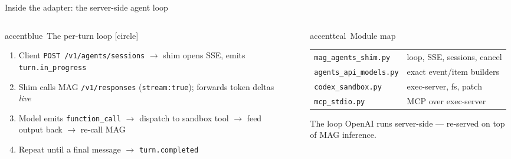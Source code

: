 \begin{frame}{Inside the adapter: the server-side agent loop}
  \begin{columns}[t, totalwidth=\textwidth]
    \begin{column}{0.52\textwidth}
      \begin{featbox}{accentblue}{\ The per-turn loop}
        \small
        [circle]
        \begin{enumerate}
          \item Client \texttt{POST /v1/agents/sessions} $\rightarrow$ shim opens SSE, emits \texttt{turn.in\_progress}
          \item Shim calls MAG \texttt{/v1/responses} (\texttt{stream:true}); forwards token deltas \emph{live}
          \item Model emits \texttt{function\_call} $\rightarrow$ dispatch to sandbox tool $\rightarrow$ feed output back $\rightarrow$ re-call MAG
          \item Repeat until a final message $\rightarrow$ \texttt{turn.completed}
        \end{enumerate}
      \end{featbox}
    \end{column}
    \begin{column}{0.04\textwidth}\end{column}
    \begin{column}{0.44\textwidth}
      \begin{featbox}{accentteal}{\ Module map}
        \scriptsize
        \renewcommand{\arraystretch}{1.3}
        \begin{tabular}{@{}l l@{}}
          \texttt{mag\_agents\_shim.py} & loop, SSE, sessions, cancel \\
          \texttt{agents\_api\_models.py} & exact event/item builders \\
          \texttt{codex\_sandbox.py} & exec-server, fs, patch \\
          \texttt{mcp\_stdio.py} & MCP over exec-server \\
        \end{tabular}
      \end{featbox}
      \vspace{4pt}
      \begin{center}
        {\scriptsize\color{midgray}The loop OpenAI runs server-side ---
        re-served on top of MAG inference.}
      \end{center}
    \end{column}
  \end{columns}
\end{frame}

